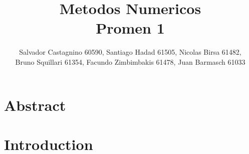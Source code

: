 \documentclass{article}
\author{Salvador Castagnino 60590, Santiago Hadad 61505, Nicolas Birsa 61482,\\ Bruno Squillari 61354, Facundo Zimbimbakis 61478, Juan Barmasch 61033}
\date{}
\title{Metodos Numericos \\ Promen 1}
\begin{document}
\maketitle 

\section*{Abstract}

\section*{Introduction}
\end{document}
